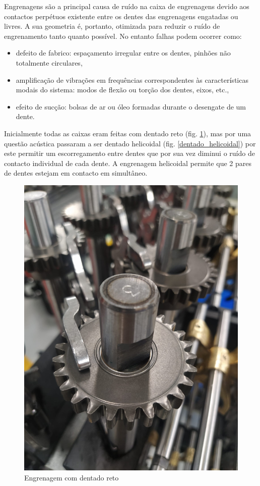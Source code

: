 Engrenagens são a principal causa de ruído na caixa de engrenagens devido aos contactos perpétuos existente entre os dentes das engrenagens engatadas ou livres. A sua geometria é, portanto, otimizada para reduzir o ruído de engrenamento tanto quanto possível. No entanto falhas podem ocorrer como:
\begin{itemize}
\item defeito de fabrico: espaçamento irregular entre os dentes, pinhões não totalmente circulares,
\item amplificação de vibrações em frequências correspondentes às características modais
do sistema: modos de flexão ou torção dos dentes, eixos, etc.,
\item efeito de sucção: bolsas de ar ou óleo formadas durante o desengate de um dente.\cite{Grainolement}
\end{itemize}

Inicialmente todas as caixas eram feitas com dentado reto (fig. \ref{dentado_reto}), mas por uma questão acústica passaram a ser dentado helicoidal (fig. \ref{dentado_helicoidal}) por este permitir um escorregamento entre dentes que por sua vez diminui o ruído de contacto individual de cada dente. A engrenagem helicoidal permite que 2 pares de dentes estejam em contacto em simultâneo. 

\begin{figure}[H]
\centering
\includegraphics[scale=0.1]{figs/dentado_reto}
\caption{Engrenagem com dentado reto}\label{dentado_reto}
\end{figure}



